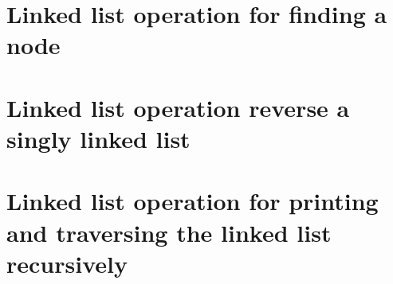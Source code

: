 \section{Linked list operation for finding a node}


\section{Linked list operation reverse a singly linked list}



\section{Linked list operation for printing and traversing the linked list recursively}







